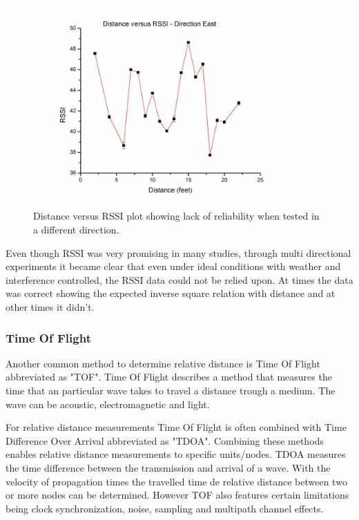 \documentclass[10pt,a4paper]{article}
\begin{document}
\begin{figure}[H]
\centering
\includegraphics[width=0.9\textwidth]{East.pdf}
\caption{Distance versus RSSI plot showing lack of
reliability when tested in a different direction.\cite{RSSI}} 
\label{East}
\end{figure}
\newpage


Even though RSSI was very promising in many studies, through multi directional experiments it became clear that even under ideal conditions with weather and interference controlled, the RSSI data could not be relied upon. At times the data was correct showing the expected inverse square relation with distance and at other times it didn't.\cite{RSSI}


\subsubsection{Time Of Flight}
Another common method to determine relative distance is Time Of Flight abbreviated as "TOF". Time Of Flight describes a method that measures the time that an particular wave takes to travel a distance trough a medium. The wave can be acoustic, electromagnetic and light.

For relative distance measurements Time Of Flight is often combined with Time Difference Over Arrival abbreviated as "TDOA". Combining these methods enables relative distance measurements to specific units/nodes. TDOA measures the time difference between the transmission and arrival of a wave. With the velocity of propagation times the travelled time de relative distance between two or more nodes can be determined. However TOF also features certain limitations being clock synchronization, noise, sampling and multipath channel effects.\cite{TOF} 
\end{document}
